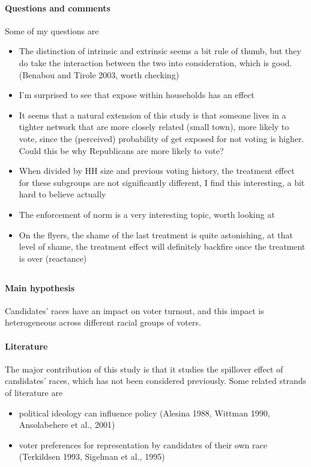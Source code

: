 \documentclass[twoside]{article}
\theoremstyle{definition}
\begin{document}
\paragraph*{Questions and comments} Some of my questions are 
\begin{itemize}
    \item The distinction of intrinsic and extrinsic seems a bit rule of thumb, but they do take the interaction between the two into consideration, which is good. (Benabou and Tirole 2003, worth checking)
    \item I'm surprised to see that expose within households has an effect
    \item It seems that a natural extension of this study is that someone lives in a tighter network that are more closely related (small town), more likely to vote, since the (perceived) probability of get exposed for not voting is higher. Could this be why Republicans are more likely to vote?
    \item When divided by HH size and previous voting history, the treatment effect for these subgroups are not significantly different, I find this interesting, a bit hard to believe actually
    \item The enforcement of norm is a very interesting topic, worth looking at
    \item On the flyers, the shame of the last treatment is quite astonishing, at that level of shame, the treatment effect will definitely backfire once the treatment is over (reactance)
\end{itemize}


\subsection*{\citet*{washington2006black}}

\paragraph*{Main hypothesis} Candidates' races have an impact on voter turnout, and this impact is heterogeneous across different racial groups of voters.

\paragraph*{Literature} The major contribution of this study is that it studies the spillover effect of candidates' races, which has not been considered previously. Some related strands of literature are 
\begin{itemize}
    \item political ideology can influence policy (Alesina 1988, Wittman 1990, Ansolabehere et al., 2001)
    \item voter preferences for representation by candidates of their own race (Terkildsen 1993, Sigelman et al., 1995)
\end{itemize}
\end{document}
